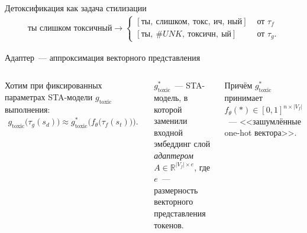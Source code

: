 \documentclass[12pt, fleqn, xcolor=x11names, xcolor=table, aspectratio=169]{beamer}
\begin{document}
\begin{frame}{Детоксификация как задача стилизации}
\begin{gather*}
    \textit{ты слишком токсичный} \longrightarrow
    \begin{cases} 
        [\textit{ты},\ \textit{слишком},\ \textit{токс},\ \textit{ич},\ \textit{ный}] &\text{ от } \tau_{f}\\
        [\textit{ты},\ \textit{\#UNK},\ \textit{токсичн},\ \textit{ый}] &\text{ от } \tau_{g}.
    \end{cases}
\end{gather*}

\end{frame}


\begin{frame}{Адаптер~--- аппроксимация векторного представления}

\begin{columns}[c]

Хотим при фиксированных параметрах STA-модели $g_{\text{toxic}}$ выполнения:
\begin{gather*}
    g_{\text{toxic}}\bigl(\tau_{g}(s_d) \bigr) \approx 
    g^{*}_{\text{toxic}} \bigl(f_{\theta} \bigl(\tau_{f}(s_t)\bigr) \bigr).
\end{gather*}

\vfill

$g^{*}_{\text{toxic}}$~--- STA-модель, в которой заменили входной эмбеддинг слой  \textit{адаптером} $A \in \mathbb{R}^{|V_f| \times e}$,
где $e$~--- размерность векторного представления токенов.

\vfill

Причём $g^{*}_{\text{toxic}}$ принимает $f_{\theta}(*) \in [0, 1]^{n \times |V_f|}$~--- <<зашумлённые one-hot вектора>>.


\end{columns}
\end{frame}
\end{document}
